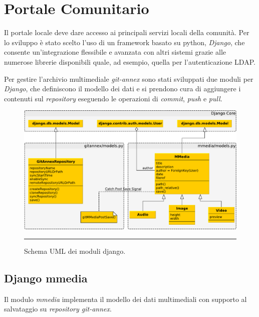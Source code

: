 \section{Portale Comunitario}

Il portale locale deve dare accesso ai principali servizi locali della
comunità. Per lo sviluppo è stato scelto l'uso di un framework basato
su python, \emph{Django}, che consente un'integrazione flessibile e
avanzata con altri sistemi grazie alle numerose librerie disponibili
quale, ad esempio, quella per l'autenticazione LDAP.

Per gestire l'archivio multimediale \emph{git-annex} sono stati
sviluppati due moduli per \emph{Django}, che definiscono il modello
dei dati e si prendono cura di aggiungere i contenuti sul
\emph{repository} eseguendo le operazioni di \emph{commit},
\emph{push} e \emph{pull}. 

\begin{figure}[htbp]
  \centering
  \includegraphics[width=\textwidth]{./Figure/UML_Schema_Django-crop.pdf}
  \rule{35em}{0.5pt}
  \caption[Schema UML dei moduli django]{Schema UML dei moduli django.}
  \label{fig:SchemaUMLDjango}
\end{figure}

\subsection{Django mmedia}

Il modulo \emph{mmedia} implementa il modello dei dati
multimediali con supporto al salvataggio su \emph{repository
  git-annex}.

